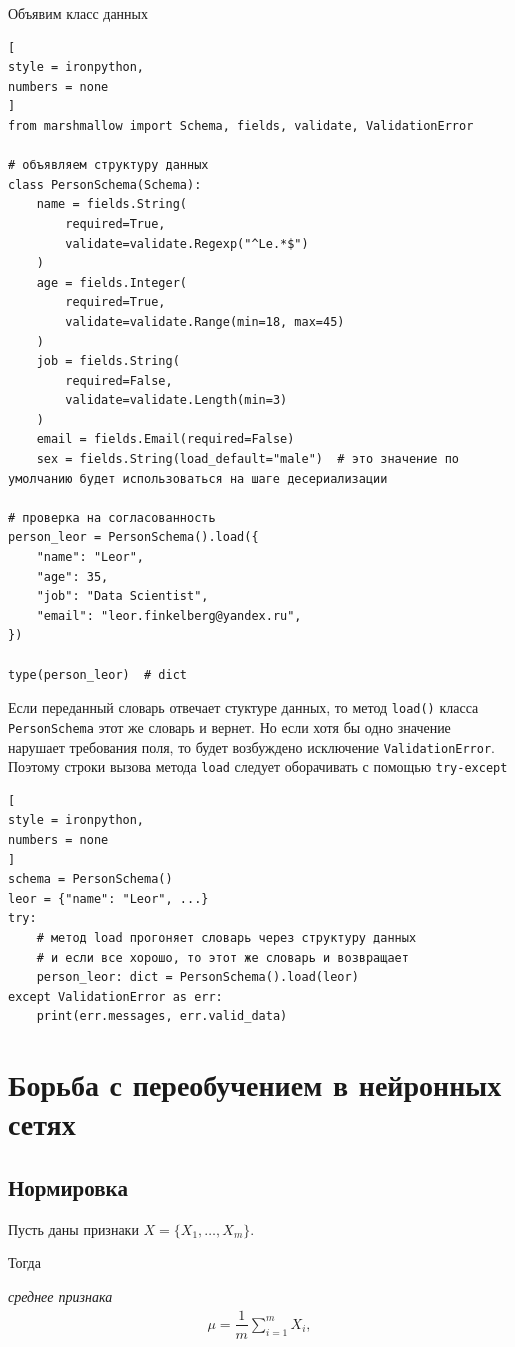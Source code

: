 \documentclass[%
	11pt,
	a4paper,
	utf8,
		]{article}
\begin{document}
Объявим класс данных
\begin{lstlisting}[
style = ironpython,
numbers = none
]
from marshmallow import Schema, fields, validate, ValidationError

# объявляем структуру данных
class PersonSchema(Schema):
    name = fields.String(
        required=True,
        validate=validate.Regexp("^Le.*$")
    )
    age = fields.Integer(
        required=True,
        validate=validate.Range(min=18, max=45)
    )
    job = fields.String(
        required=False,
        validate=validate.Length(min=3)
    )
    email = fields.Email(required=False)
    sex = fields.String(load_default="male")  # это значение по умолчанию будет использоваться на шаге десериализации

# проверка на согласованность 
person_leor = PersonSchema().load({
    "name": "Leor",
    "age": 35,
    "job": "Data Scientist",
    "email": "leor.finkelberg@yandex.ru",
})

type(person_leor)  # dict
\end{lstlisting}

Если переданный словарь отвечает стуктуре данных, то метод \verb*|load()| класса \verb*|PersonSchema| этот же словарь и вернет. Но если хотя бы одно значение нарушает требования поля, то будет возбуждено исключение \verb*|ValidationError|. Поэтому строки вызова метода \verb*|load| следует оборачивать с помощью \verb*|try-except|
\begin{lstlisting}[
style = ironpython,
numbers = none	
]
schema = PersonSchema()
leor = {"name": "Leor", ...}
try:
    # метод load прогоняет словарь через структуру данных
    # и если все хорошо, то этот же словарь и возвращает
    person_leor: dict = PersonSchema().load(leor)
except ValidationError as err:
    print(err.messages, err.valid_data)
\end{lstlisting}


\section{Борьба с переобучением в нейронных сетях}

\subsection{Нормировка}

Пусть даны признаки $ X = \{X_1, \ldots, X_m\} $.

Тогда

\emph{среднее признака}
\begin{align*}
	\mu = \dfrac{1}{m} \sum_{i=1}^m X_i,
\end{align*}
\end{document}
